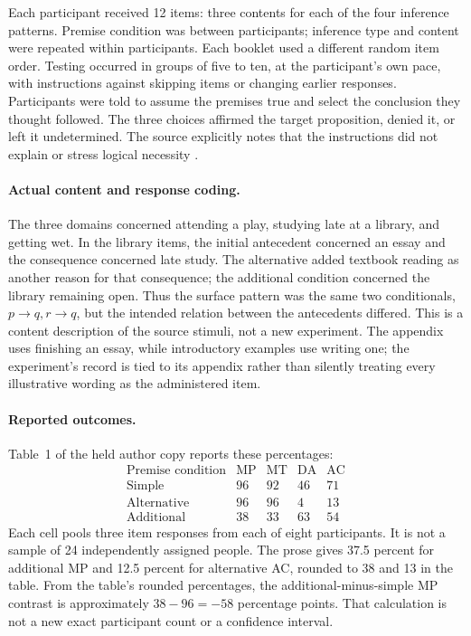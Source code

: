 Each participant received 12 items: three contents for each of the four
inference patterns. Premise condition was between participants; inference
type and content were repeated within participants. Each booklet used a
different random item order. Testing occurred in groups of five to ten,
at the participant's own pace, with instructions against skipping items or
changing earlier responses. Participants were told to assume the premises
true and select the conclusion they thought followed. The three choices
affirmed the target proposition, denied it, or left it undetermined.
The source explicitly notes that the instructions did not explain or stress
logical necessity \cite[pp.~67--69]{Byrne1989Suppression}.

\paragraph{Actual content and response coding.}
The three domains concerned attending a play, studying late at a library,
and getting wet. In the library items, the initial antecedent concerned
an essay and the consequence concerned late study. The alternative added
textbook reading as another reason for that consequence; the additional
condition concerned the library remaining open. Thus the surface pattern
was the same two conditionals, \(p\to q,r\to q\), but the intended
relation between the antecedents differed. This is a content description
of the source stimuli, not a new experiment. The appendix uses finishing
an essay, while introductory examples use writing one; the experiment's
record is tied to its appendix rather than silently treating every
illustrative wording as the administered item.

\paragraph{Reported outcomes.}
Table~1 of the held author copy reports these percentages:
\[
\begin{array}{l|rrrr}
 \text{Premise condition}&\mathrm{MP}&\mathrm{MT}&\mathrm{DA}&\mathrm{AC}\\\hline
 \text{Simple}&96&92&46&71\\
 \text{Alternative}&96&96&4&13\\
 \text{Additional}&38&33&63&54
\end{array}
\]
Each cell pools three item responses from each of eight participants.
It is not a sample of 24 independently assigned people. The prose gives
37.5 percent for additional MP and 12.5 percent for alternative AC,
rounded to 38 and 13 in the table. From the table's rounded percentages,
the additional-minus-simple MP contrast is approximately
\(38-96=-58\) percentage points. That calculation is not a new exact
participant count or a confidence interval.

